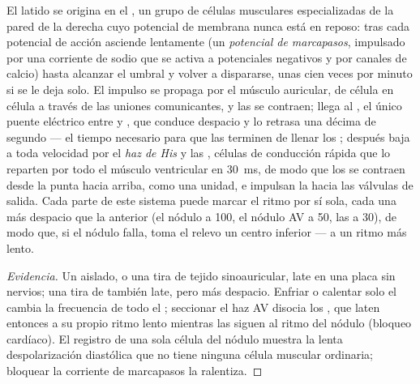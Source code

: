 \begin{proposition}\label{prop:b2:heart:conduction}
El latido se origina en el \emph{}, un grupo de
células musculares especializadas de la pared de la  derecha cuyo
potencial de membrana nunca está en reposo: tras cada potencial de acción
asciende lentamente (un \emph{potencial de marcapasos}, impulsado por una
corriente de sodio que se activa a potenciales negativos y por canales de
calcio) hasta alcanzar el umbral y volver a dispararse, unas cien veces
por minuto si se le deja solo. El impulso se propaga por el músculo
auricular, de célula en célula a través de las uniones comunicantes, y las
 se contraen; llega al \emph{}, el único
puente eléctrico entre  y , que conduce despacio y lo
retrasa una décima de segundo --- el tiempo necesario para que las
 terminen de llenar los ; después baja a toda
velocidad por el \emph{haz de His} y las \emph{}, células
de conducción rápida que lo reparten por todo el músculo ventricular en
\qty{30}{ms}, de modo que los  se contraen desde la punta hacia
arriba, como una unidad, e impulsan la  hacia las válvulas de
salida. Cada parte de este sistema puede marcar el ritmo por sí sola, cada
una más despacio que la anterior (el nódulo a 100, el nódulo AV a 50, las
 a 30), de modo que, si el nódulo falla, toma el relevo
un centro inferior --- a un ritmo más lento.
\end{proposition}
\begin{proof}[Evidencia]
Un  aislado, o una tira de tejido sinoauricular, late en una placa
sin nervios; una tira de  también late, pero más despacio.
Enfriar o calentar solo el  cambia la frecuencia de
todo el ; seccionar el haz AV disocia los , que laten
entonces a su propio ritmo lento mientras las  siguen al ritmo
del nódulo (bloqueo cardíaco). El registro de una sola célula del nódulo
muestra la lenta despolarización diastólica que no tiene ninguna célula
muscular ordinaria; bloquear la corriente de marcapasos la ralentiza.
\end{proof}
